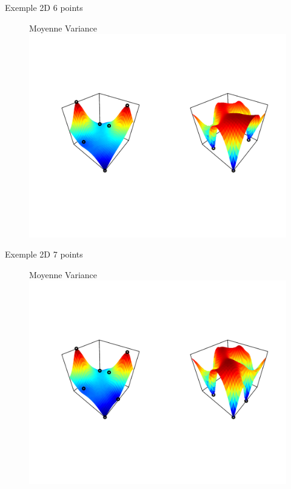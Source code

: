 \begin{frame}[noframenumbering]{Exemple 2D}
6 points
\begin{figure}
\hspace{5mm} Moyenne \hspace{50mm} Variance
	\includegraphics[trim=12mm 40mm 12mm 40mm,width=\textwidth, clip]{mse/maxMSE2.pdf}
\end{figure}
\end{frame}
\begin{frame}[noframenumbering]{Exemple 2D}
7 points
\begin{figure}
\hspace{5mm} Moyenne \hspace{50mm} Variance
	\includegraphics[trim=12mm 40mm 12mm 40mm,width=\textwidth, clip]{mse/maxMSE3.pdf}
\end{figure}
\end{frame}
